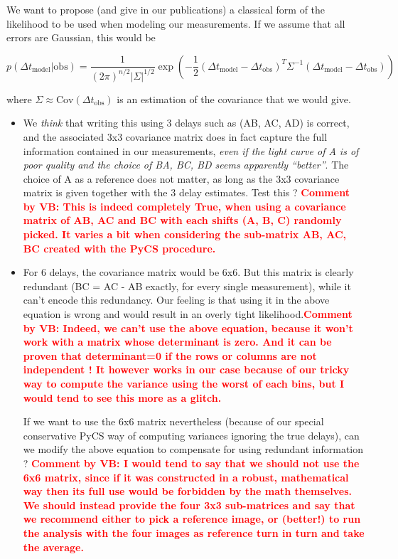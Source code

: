 \documentclass[11pt]{scrartcl}
\newcommand{\com}[2]{\xspace\textcolor{red}{\textbf{Comment by #1: #2}}}
\newcommand{\dt}[1]{\ensuremath{\Delta t_{\mathrm{#1}}}\xspace}
\begin{document}
We want to propose (and give in our publications) a classical form of the likelihood to be used when modeling our measurements. If we assume that all errors are Gaussian, this would be

\begin{equation}
p(\dt{model} | \mathrm{obs}) = \frac{1}{(2 \pi)^{n/2} |\Sigma|^{1/2}}\exp\left( -\frac{1}{2} (\dt{model}-\dt{obs})^T\Sigma^{-1}(\dt{model}-\dt{obs}) \right)
\end{equation}

where $\Sigma \approx \textrm{Cov}(\dt{obs})$ is an estimation of the covariance that we would give.

\begin{itemize}
\item We \emph{think} that writing this using 3 delays such as (AB, AC, 
AD) is correct, and the associated 3x3 covariance matrix does in fact 
capture the full information contained in our measurements, \emph{even 
if the light curve of A is of poor quality and the choice of BA, BC, BD 
seems apparently ``better''}. The choice of A as a reference does not 
matter, as long as the 3x3 covariance matrix is given together with the 
3 delay estimates. Test this ? \com{VB}{This is indeed completely True, 
when using a covariance matrix of AB, AC and BC with each shifts (A, B, 
C) randomly picked. It varies a bit when considering the sub-matrix AB, 
AC, BC created with the PyCS procedure.}


\item For 6 delays, the covariance matrix would be 6x6. But this matrix 
is clearly redundant (BC = AC - AB exactly, for every single 
measurement), while it can't encode this redundancy. Our feeling is that 
using it in the above equation is wrong and would result in an overly 
tight likelihood.\com{VB}{Indeed, we can't use the above equation, 
because it {\textbf won't} work with a matrix whose determinant is 
zero. And it can be proven that determinant=0 if the rows or columns are 
not independent ! It however works in our case because of our tricky way 
to compute the variance using the worst of each bins, but I would tend 
to see this more as a glitch.}


If we want to use the 6x6 matrix nevertheless (because of our special 
conservative PyCS way of computing variances ignoring the true delays), 
can we modify the above equation to compensate for using redundant 
information ? \com{VB}{I would tend to say that we should not use the 
6x6 matrix, since if it was constructed in a robust, mathematical way 
then its full use would be forbidden by the math themselves. We should 
instead provide the four 3x3 sub-matrices and say that we recommend 
either to pick a reference image, or (better!) to run the analysis with 
the four images as reference turn in turn and take the average.}

\end{itemize}
\newpage
\end{document}
